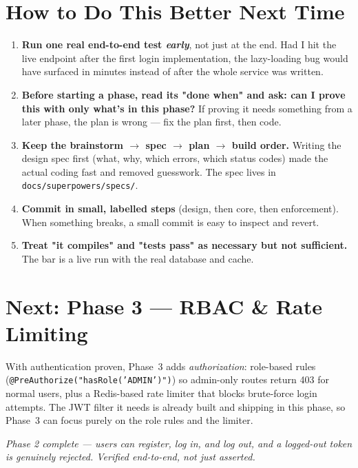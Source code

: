 \documentclass[11pt,a4paper]{article}
\newcommand{\code}[1]{\texttt{#1}}
\begin{document}
\section{How to Do This Better Next Time}
\begin{enumerate}[leftmargin=*]
  \item \textbf{Run one real end-to-end test \emph{early}}, not just at the end. Had I hit the live
        endpoint after the first login implementation, the lazy-loading bug would have surfaced in
        minutes instead of after the whole service was written.
  \item \textbf{Before starting a phase, read its "done when" and ask: can I prove this with only
        what's in this phase?} If proving it needs something from a later phase, the plan is wrong ---
        fix the plan first, then code.
  \item \textbf{Keep the brainstorm $\rightarrow$ spec $\rightarrow$ plan $\rightarrow$ build order.}
        Writing the design spec first (what, why, which errors, which status codes) made the actual
        coding fast and removed guesswork. The spec lives in
        \code{docs/superpowers/specs/}.
  \item \textbf{Commit in small, labelled steps} (design, then core, then enforcement). When
        something breaks, a small commit is easy to inspect and revert.
  \item \textbf{Treat "it compiles" and "tests pass" as necessary but not sufficient.} The bar is a
        live run with the real database and cache.
\end{enumerate}

\section{Next: Phase 3 --- RBAC \& Rate Limiting}
With authentication proven, Phase~3 adds \emph{authorization}: role-based rules
(\code{@PreAuthorize("hasRole('ADMIN')")}) so admin-only routes return 403 for normal users, plus a
Redis-based rate limiter that blocks brute-force login attempts. The JWT filter it needs is already
built and shipping in this phase, so Phase~3 can focus purely on the role rules and the limiter.

\vspace{1em}
\begin{center}\itshape Phase 2 complete --- users can register, log in, and log out, and a
logged-out token is genuinely rejected. Verified end-to-end, not just asserted.\end{center}
\end{document}
